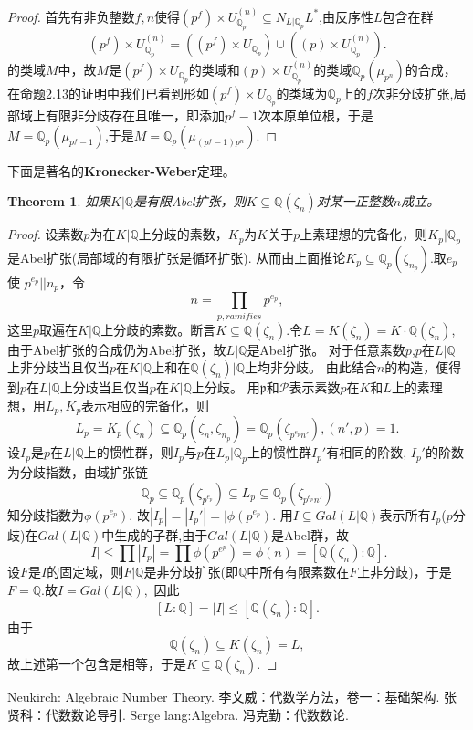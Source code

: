 \documentclass[UTF8]{article}
\newtheorem{thm}{Theorem}[section]
\begin{document}
\begin{proof}
	首先有非负整数$f,n$使得$(p^{f})\times U_{\mathbb{Q}_{p}}^{(n)}\subseteq N_{L|\mathbb{Q}_{p}}L^{*}$,由反序性$L$包含在群
	$$
	(p^{f})\times U_{\mathbb{Q}_{p}}^{(n)}=((p^{f})\times U_{\mathbb{Q}_{p}})\cup((p)\times U_{\mathbb{Q}_{p}}^{(n)}).
	$$
	的类域$M$中，故$M$是$(p^{f})\times U_{\mathbb{Q}_{p}}$的类域和$(p)\times U_{\mathbb{Q}_{p}}^{(n)}$的类域$\mathbb{Q}_{p}(\mu_{p^{n}})$的合成，在命题2.13的证明中我们已看到形如$(p^{f})\times U_{\mathbb{Q}_{p}}$的类域为$\mathbb{Q}_{p}$上的$f$次非分歧扩张,局部域上有限非分歧存在且唯一，即添加$p^{f}-1$次本原单位根，于是$M=\mathbb{Q}_{p}(\mu_{p^{f}-1})$,于是$M=\mathbb{Q}_{p}(\mu_{(p^{f}-1)p^{n}}).$
\end{proof}
下面是著名的\textbf{Kronecker-Weber}定理。
\begin{thm}
	如果$K|\mathbb{Q}$是有限Abel扩张，则$K\subseteq \mathbb{Q}(\zeta_{n})$对某一正整数$n$成立。
\end{thm}
\begin{proof}
	设素数$p$为在$K|\mathbb{Q}$上分歧的素数，$K_{p}$为$K$关于$p$上素理想的完备化，则$K_{p}|\mathbb{Q}_{p}$是Abel扩张(局部域的有限扩张是循环扩张).
	从而由上面推论$K_{p}\subseteq \mathbb{Q}_{p}(\zeta_{n_{p}})$.取$e_{p}$使
	$p^{e_{p}}||n_{p}$，令$$
	n=\prod_{p,ramifies}p^{e_{p}},
	$$
	这里$p$取遍在$K|\mathbb{Q}$上分歧的素数。断言$K\subseteq \mathbb{Q}(\zeta_{n}).$令$L=K(\zeta_{n})=K\cdot\mathbb{Q}(\zeta_{n})$,由于Abel扩张的合成仍为Abel扩张，故$L|\mathbb{Q}$是Abel扩张。
	对于任意素数$p$,$p$在$L|\mathbb{Q}$上非分歧当且仅当$p$在$K|\mathbb{Q}$上和在$\mathbb{Q}(\zeta_{n})|\mathbb{Q}$上均非分歧。
	由此结合$n$的构造，便得到$p$在$L|\mathbb{Q}$上分歧当且仅当$p$在$K|\mathbb{Q}$上分歧。
	用$\mathfrak{p}$和$\mathcal{P}$表示素数$p$在$K$和$L$上的素理想，用$L_{p},K_{p}$表示相应的完备化，则$$L_{p}=K_{p}(\zeta_{n})\subseteq \mathbb{Q}_{p}(\zeta_{n},\zeta_{n_{p}})= \mathbb{Q}_{p}(\zeta_{p^{e_{p}}n'}),(n',p)=1.$$
	设$I_{p}$是$p$在$L|\mathbb{Q}$上的惯性群，则$I_{p}$与$p$在$L_{p}|\mathbb{Q}_{p}$上的惯性群$I_{p}'$有相同的阶数,
	$I_{p}'$的阶数为分歧指数，由域扩张链
	$$\mathbb{Q}_{p}\subseteq \mathbb{Q}_{p}(\zeta_{p^{e_{p}}})\subseteq L_{p}\subseteq \mathbb{Q}_{p}(\zeta_{p^{e_{p}}n'})$$
	知分歧指数为$\phi(p^{e_{p}}).$
	故$|I_{p}|=|I_{p}'|=|\phi(p^{e_{p}}).$
	用$I\subseteq Gal(L|\mathbb{Q})$表示所有$I_{p}$($p$分歧)在$Gal(L|\mathbb{Q})$中生成的子群,由于$Gal(L|\mathbb{Q})$是Abel群，故
	$$
	|I|\leq  \prod |I_{p}|=\prod \phi(p^{e^{p}})=\phi(n)=[\mathbb{Q}(\zeta_{n}):\mathbb{Q}].
	$$
	设$F$是$I$的固定域，则$F|\mathbb{Q}$是非分歧扩张(即$\mathbb{Q}$中所有有限素数在$F$上非分歧)，于是$F=\mathbb{Q}.$故$I=Gal(L|\mathbb{Q}),$
	因此$$
	[L:\mathbb{Q}]=|I|\leq [\mathbb{Q}(\zeta_{n}):\mathbb{Q}].
	$$
	由于$$
	\mathbb{Q}(\zeta_{n})\subseteq  K(\zeta_{n})=L,
	$$
	故上述第一个包含是相等，于是$K\subseteq \mathbb{Q}(\zeta_{n}).$
	
\end{proof}

	  \begin{thebibliography}{99}
		 Neukirch:
		Algebraic Number Theory.
		 李文威：代数学方法，卷一：基础架构.
		张贤科：代数数论导引.
		Serge lang:Algebra.
		冯克勤：代数数论.
	\end{thebibliography}
\end{document}
